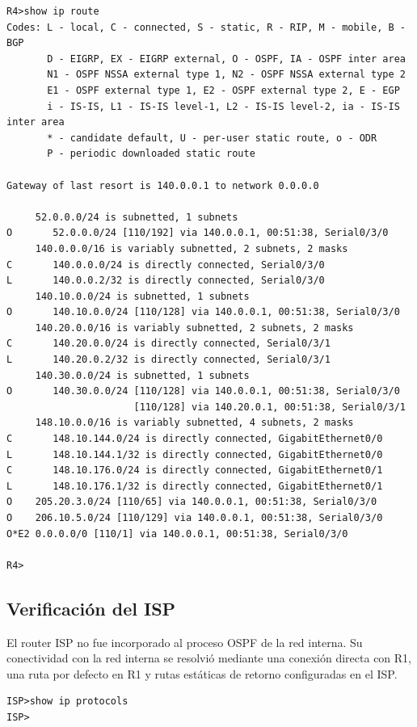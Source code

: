 \documentclass[12pt,a4paper]{article}
\begin{document}
\begin{verbatim}
R4>show ip route
Codes: L - local, C - connected, S - static, R - RIP, M - mobile, B - BGP
       D - EIGRP, EX - EIGRP external, O - OSPF, IA - OSPF inter area
       N1 - OSPF NSSA external type 1, N2 - OSPF NSSA external type 2
       E1 - OSPF external type 1, E2 - OSPF external type 2, E - EGP
       i - IS-IS, L1 - IS-IS level-1, L2 - IS-IS level-2, ia - IS-IS inter area
       * - candidate default, U - per-user static route, o - ODR
       P - periodic downloaded static route

Gateway of last resort is 140.0.0.1 to network 0.0.0.0

     52.0.0.0/24 is subnetted, 1 subnets
O       52.0.0.0/24 [110/192] via 140.0.0.1, 00:51:38, Serial0/3/0
     140.0.0.0/16 is variably subnetted, 2 subnets, 2 masks
C       140.0.0.0/24 is directly connected, Serial0/3/0
L       140.0.0.2/32 is directly connected, Serial0/3/0
     140.10.0.0/24 is subnetted, 1 subnets
O       140.10.0.0/24 [110/128] via 140.0.0.1, 00:51:38, Serial0/3/0
     140.20.0.0/16 is variably subnetted, 2 subnets, 2 masks
C       140.20.0.0/24 is directly connected, Serial0/3/1
L       140.20.0.2/32 is directly connected, Serial0/3/1
     140.30.0.0/24 is subnetted, 1 subnets
O       140.30.0.0/24 [110/128] via 140.0.0.1, 00:51:38, Serial0/3/0
                      [110/128] via 140.20.0.1, 00:51:38, Serial0/3/1
     148.10.0.0/16 is variably subnetted, 4 subnets, 2 masks
C       148.10.144.0/24 is directly connected, GigabitEthernet0/0
L       148.10.144.1/32 is directly connected, GigabitEthernet0/0
C       148.10.176.0/24 is directly connected, GigabitEthernet0/1
L       148.10.176.1/32 is directly connected, GigabitEthernet0/1
O    205.20.3.0/24 [110/65] via 140.0.0.1, 00:51:38, Serial0/3/0
O    206.10.5.0/24 [110/129] via 140.0.0.1, 00:51:38, Serial0/3/0
O*E2 0.0.0.0/0 [110/1] via 140.0.0.1, 00:51:38, Serial0/3/0

R4>
\end{verbatim}

\subsection{Verificación del ISP}

El router ISP no fue incorporado al proceso OSPF de la red interna. Su conectividad con la red interna se resolvió mediante una conexión directa con R1, una ruta por defecto en R1 y rutas estáticas de retorno configuradas en el ISP.

\begin{verbatim}
ISP>show ip protocols
ISP>
\end{verbatim}
\end{document}
